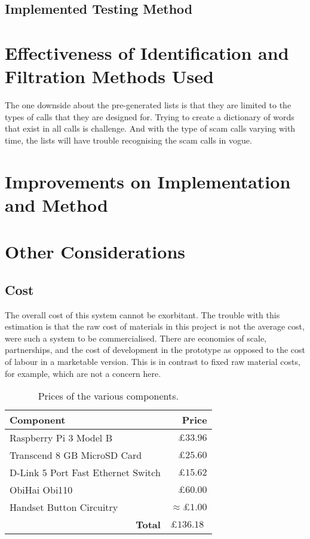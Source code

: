 \documentclass[main.tex]{subfiles}
\begin{document}
\subsection{Implemented Testing Method}

\section{Effectiveness of Identification and Filtration Methods Used}

The one downside about the pre-generated lists is that they are limited to the types of calls that they are designed for. Trying to create a dictionary of words that exist in all calls is challenge. And with the type of scam calls varying with time, the lists will have trouble recognising the scam calls in vogue.

\section{Improvements on Implementation and Method}

\section{Other Considerations}
\subsection{Cost}
The overall cost of this system cannot be exorbitant. The trouble with this estimation is that the raw cost of materials in this project is not the average cost, were such a system to be commercialised. There are economies of scale, partnerships, and the cost of development in the prototype as opposed to the cost of labour in a marketable version. This is in contrast to fixed raw material costs, for example, which are not a concern here.

\begin{table}[htb]
	\centering
	\begin{tabular}{|l|r|}
		\hline
		\textbf{Component} 							& \textbf{Price}    								\\\hline
		Raspberry Pi 3 Model B        				& $\pounds 33.96$   								\\
		Transcend 8 GB MicroSD Card 				& $\pounds 25.60$   								\\
		D-Link 5 Port Fast Ethernet Switch 			& $\pounds 15.62$   								\\
		ObiHai Obi110           					& $\pounds 60.00$      								\\
		Handset Button Circuitry    				& $\approx \pounds 1.00$ 							\\\hline
		\multicolumn{1}{|r|}{\textbf{Total}}  & \multicolumn{1}{|l|}{$\pounds 136.18$}  	\\\hline
	\end{tabular}
	\caption{Prices of the various components.}
	\label{tbl:costs}
\end{table}
\end{document}
